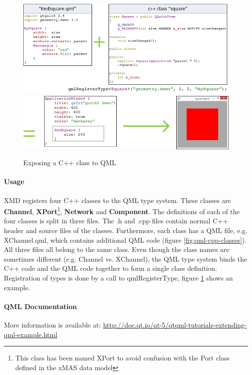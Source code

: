 \begin{figure}
    \includegraphics[width=\textwidth]{qml1}
    \includegraphics[width=\textwidth]{qml2}
    \caption{Exposing a C++ class to QML}
    \label{fig:register-qml}
\end{figure}

\paragraph{Usage}XMD registers four C++ classes to the QML type system. These classes
are \textbf{Channel}, \textbf{XPort}\footnote{This class has been named XPort to
avoid confusion with the Port class defined in the xMAS data model}, \textbf{Network}
and \textbf{Component}. The definitions of each of the four classes is split in
three files. The .h and .cpp files contain normal C++ header and source files of
the classes. Furthermore, each class has a QML file, e.g. XChannel.qml, which contains
additional QML code (figure \ref{fig:qml-cpp-classes}). All three files all belong to
the same class. Even though the class names are sometimes different (e.g. Channel vs.
XChannel), the QML type system binds the C++ code and the QML code together to form a
single class definition. Registration of types is done by a call to qmlRegisterType,
figure \ref{fig:register-qml} shows an example.

\paragraph{QML Documentation}
More information is available at:
\url{http://doc.qt.io/qt-5/qtqml-tutorials-extending-qml-example.html}






